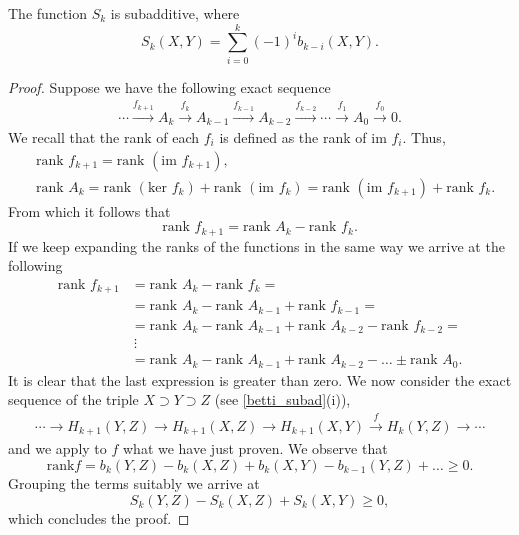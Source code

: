 \begin{lemma}
\label{lema_desig_morse}
    The function $S_{k}$ is subadditive, where
    \begin{equation*}
        S_{k}(X,Y) = \sum_{i=0}^{k} (-1)^i b_{k-i}(X,Y).
    \end{equation*}
\end{lemma}
\begin{proof}
    Suppose we have the following exact sequence
    \begin{align*}
        \cdots \overset{f_{k+1}}{\longrightarrow} A_k \overset{f_{k}}{\longrightarrow} A_{k-1} \overset{f_{k-1}}{\longrightarrow} A_{k-2} \overset{f_{k-2}}{\longrightarrow} \cdots \overset{f_{1}}{\longrightarrow} A_0 \overset{f_{0}}{\longrightarrow} 0.
    \end{align*}
    We recall that the rank of each $f_i$ is defined as the rank of $\text{im } f_i$. Thus,
    \begin{align*}
        &\text{rank } f_{k+1} = \text{rank } (\text{im }f_{k+1}),\\
        &\text{rank }A_k = \text{rank } (\text{ker }f_{k}) + \text{rank } (\text{im }f_{k}) = \text{rank } (\text{im }f_{k+1}) + \text{rank } f_{k}.
    \end{align*}
    From which it follows that
    \begin{equation*}
        \text{rank } f_{k+1}  = \text{rank }A_k - \text{rank } f_{k}.
    \end{equation*}
    If we keep expanding the ranks of the functions in the same way we arrive at the following
    \begin{align*}
        \text{rank } f_{k+1}  &= \text{rank }A_k - \text{rank } f_{k}=\\
        &= \text{rank }A_k - \text{rank }A_{k-1} + \text{rank } f_{k-1} =\\
        &= \text{rank }A_k - \text{rank }A_{k-1} + \text{rank }A_{k-2} - \text{rank } f_{k-2} =\\
        &~\vdots\\
        &= \text{rank }A_k - \text{rank }A_{k-1} + \text{rank }A_{k-2} - \dots \pm \text{rank }A_0.
    \end{align*}
    It is clear that the last expression is greater than zero. We now consider the exact sequence of the triple $X\supset Y\supset Z$ (see \ref{betti_subad}(i)),
    \begin{align*}
        \cdots \longrightarrow H_{k+1}(Y,Z) \longrightarrow H_{k+1}(X,Z) \longrightarrow H_{k+1}(X,Y) \overset{f}{\longrightarrow} H_{k}(Y,Z) \longrightarrow \cdots
    \end{align*}
    and we apply to $f$ what we have just proven. We observe that
    \begin{equation*}
        \text{rank} f = b_k(Y,Z) - b_k(X,Z) + b_k(X,Y) - b_{k-1}(Y,Z) + \dots \ge 0.
    \end{equation*}
    Grouping the terms suitably we arrive at
    \begin{equation}
    \label{demo_charac}
        S_{k}(Y,Z) - S_{k}(X,Z) + S_{k}(X,Y) \ge 0,
    \end{equation}
    which concludes the proof.

\end{proof}

